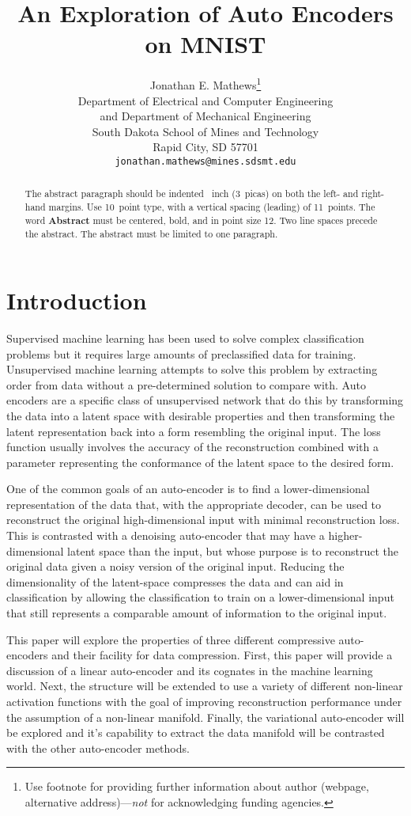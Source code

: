 \documentclass{article}
\title{An Exploration of Auto Encoders on MNIST}
\author{
  Jonathan E. Mathews\thanks{Use footnote for providing further
    information about author (webpage, alternative
    address)---\emph{not} for acknowledging funding agencies.} \\
  Department of Electrical and Computer Engineering\\
  and Department of Mechanical Engineering\\
  South Dakota School of Mines and Technology\\
  Rapid City, SD 57701 \\
  \texttt{jonathan.mathews@mines.sdsmt.edu} \\
}
\begin{document}
\maketitle

\begin{abstract}
  The abstract paragraph should be indented ~inch
  (3~picas) on both the left- and right-hand margins. Use 10~point
  type, with a vertical spacing (leading) of 11~points.  The word
  \textbf{Abstract} must be centered, bold, and in point size 12. Two
  line spaces precede the abstract. The abstract must be limited to
  one paragraph.
\end{abstract}

\section{Introduction}
Supervised machine learning has been used to solve complex classification problems but it requires large amounts of preclassified data for training. Unsupervised machine learning attempts to solve this problem by extracting order from data without a pre-determined solution to compare with. Auto encoders are a specific class of unsupervised network that do this by transforming the data into a latent space with desirable properties and then transforming the latent representation back into a form resembling the original input. The loss function usually involves the accuracy of the reconstruction combined with a parameter representing the conformance of the latent space to the desired form.

One of the common goals of an auto-encoder is to find a lower-dimensional representation of the data that, with the appropriate decoder, can be used to reconstruct the original high-dimensional input with minimal reconstruction loss. This is contrasted with a denoising auto-encoder that may have a higher-dimensional latent space than the input, but whose purpose is to reconstruct the original data given a noisy version of the original input. Reducing the dimensionality of the latent-space compresses the data and can aid in classification by allowing the classification to train on a lower-dimensional input that still represents a comparable amount of information to the original input.

This paper will explore the properties of three different compressive auto-encoders and their facility for data compression.  First, this paper will provide a discussion of a linear auto-encoder and its cognates in the machine learning world. Next, the structure will be extended to use a variety of different non-linear activation functions with the goal of improving reconstruction performance under the assumption of a non-linear manifold. Finally, the variational auto-encoder will be explored and it's capability to extract the data manifold will be contrasted with the other auto-encoder methods.
\end{document}

